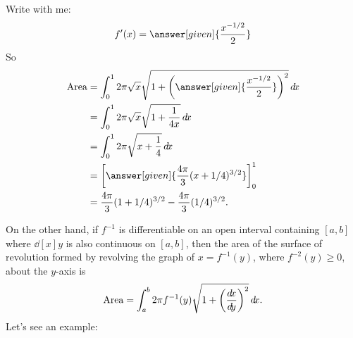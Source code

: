 \documentclass{ximera}
\begin{document}
\begin{example}
\begin{explanation}
\begin{image}
    \end{image}
    Write with me:
    \[
    f'(x) = \answer[given]{\frac{x^{-1/2}}{2}}
    \]
    So
    \begin{align*}
      \text{Area} &= \int_0^1 2\pi \sqrt{x} \sqrt{1 + \left(\answer[given]{\frac{x^{-1/2}}{2}}\right)^2} \d x\\
      &= \int_0^1 2\pi \sqrt{x} \sqrt{1 + \frac{1}{4x}} \d x\\
      &= \int_0^1 2\pi \sqrt{x+\frac{1}{4}} \d x\\
      &= \eval{\answer[given]{\frac{4\pi}{3}(x+1/4)^{3/2}}}_0^1\\
      &= \frac{4\pi}{3}(1+1/4)^{3/2}  - \frac{4\pi}{3}(1/4)^{3/2}.
    \end{align*}
  \end{explanation}
\end{example}


On the other hand, if $f^{-1}$ is differentiable on
an open interval containing $[a,b]$ where $\dd[x]{y}$ is also continuous on
$[a,b]$, then the area of the surface of revolution formed by
revolving the graph of $x=f^{-1}(y)$, where $f^{-2}(y)\ge 0$, about the $y$-axis
is
\[
\text{Area} = \int_a^b 2\pi f^{-1}(y)\sqrt{1+\left(\dd[x]{y}\right)^2}\d x.
\]
Let's see an example:
\end{document}
